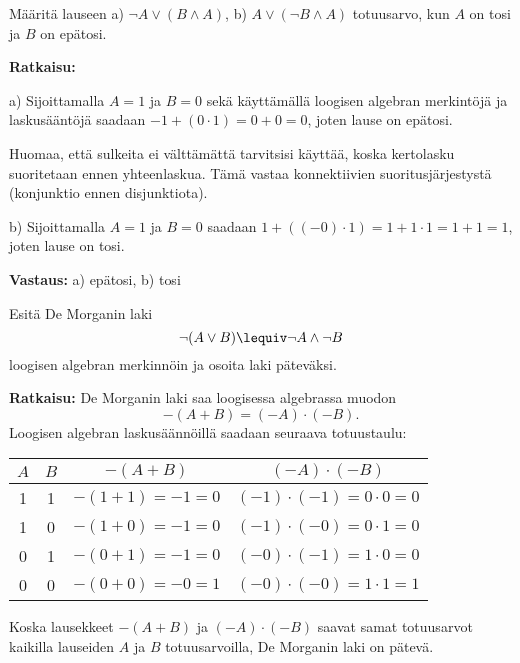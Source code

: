 \begin{esimerkki}
Määritä lauseen
 a) $\lnot A \lor (B\land A)$,  b) $A\lor (\lnot B \land A)$  
totuusarvo, kun $A$ on tosi ja $B$ on epätosi.

{\bf Ratkaisu:}

a) Sijoittamalla $A=1$ ja $B=0$ sekä käyttämällä loogisen algebran merkintöjä ja laskusääntöjä saadaan $-1+(0\cdot 1) = 0 + 0 =  0$, joten lause on epätosi.

Huomaa, että sulkeita ei välttämättä tarvitsisi käyttää, koska kertolasku suoritetaan ennen yhteenlaskua. Tämä vastaa konnektiivien suoritusjärjestystä (konjunktio ennen disjunktiota).

b) Sijoittamalla $A=1$ ja $B=0$ saadaan $1 + ((- 0)\cdot1) = 1 + 1\cdot1 = 1 + 1 = 1$, joten lause on tosi.

{\bf Vastaus:} a) epätosi, b) tosi
\end{esimerkki}

\begin{esimerkki}
Esitä De Morganin laki
\[
\lnot (A\lor B) \lequiv \lnot A\land \lnot B
\]
loogisen algebran merkinnöin ja osoita laki päteväksi.

{\bf Ratkaisu:}
De Morganin laki saa loogisessa algebrassa muodon
\[
- (A + B) =( - A )\cdot( - B ).
\]
Loogisen algebran laskusäännöillä saadaan seuraava totuustaulu:

\begin{tabular}{|c|c|c|c|}
\hline
$A$ & $B$ & $- (A + B)$ & $( - A )\cdot( - B )$\\ \hline
1 & 1 & $- (1 + 1) = - 1 = 0$ & $( - 1 )\cdot ( - 1 ) = 0\cdot 0
= 0$\\ \hline
1 & 0 & $- (1 + 0) = - 1 = 0$ & $( - 1 )\cdot ( - 0 ) = 0\cdot 1
= 0$\\ \hline
0 & 1 & $- (0 + 1) = - 1 = 0$ & $( - 0 )\cdot( - 1 ) = 1\cdot 0 =
0$\\ \hline
0 & 0 & $- (0 + 0) = - 0 = 1$ & $( - 0 )\cdot( - 0 ) = 1\cdot 1 =
1$\\ \hline
\end{tabular}

Koska lausekkeet $- (A + B)$ ja $( - A ) \cdot ( - B )$ saavat
samat totuusarvot kaikilla lauseiden $A$ ja $B$ totuusarvoilla,
De Morganin laki on pätevä.
\end{esimerkki}


